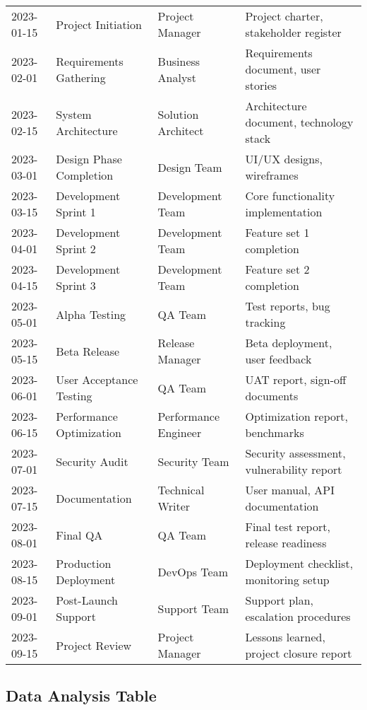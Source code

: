 \documentclass[a4paper,11pt,xetex]{article}
\begin{document}
\begin{longtable}{p{2cm}p{4cm}p{3cm}p{4cm}}
2023-01-15 & Project Initiation & Project Manager & Project charter, stakeholder register \\
\rowcolor{rowalt}
2023-02-01 & Requirements Gathering & Business Analyst & Requirements document, user stories \\
2023-02-15 & System Architecture & Solution Architect & Architecture document, technology stack \\
\rowcolor{rowalt}
2023-03-01 & Design Phase Completion & Design Team & UI/UX designs, wireframes \\
2023-03-15 & Development Sprint 1 & Development Team & Core functionality implementation \\
\rowcolor{rowalt}
2023-04-01 & Development Sprint 2 & Development Team & Feature set 1 completion \\
2023-04-15 & Development Sprint 3 & Development Team & Feature set 2 completion \\
\rowcolor{rowalt}
2023-05-01 & Alpha Testing & QA Team & Test reports, bug tracking \\
2023-05-15 & Beta Release & Release Manager & Beta deployment, user feedback \\
\rowcolor{rowalt}
2023-06-01 & User Acceptance Testing & QA Team & UAT report, sign-off documents \\
2023-06-15 & Performance Optimization & Performance Engineer & Optimization report, benchmarks \\
\rowcolor{rowalt}
2023-07-01 & Security Audit & Security Team & Security assessment, vulnerability report \\
2023-07-15 & Documentation & Technical Writer & User manual, API documentation \\
\rowcolor{rowalt}
2023-08-01 & Final QA & QA Team & Final test report, release readiness \\
2023-08-15 & Production Deployment & DevOps Team & Deployment checklist, monitoring setup \\
\rowcolor{rowalt}
2023-09-01 & Post-Launch Support & Support Team & Support plan, escalation procedures \\
2023-09-15 & Project Review & Project Manager & Lessons learned, project closure report \\
\end{longtable}

\subsection{Data Analysis Table}
\end{document}
